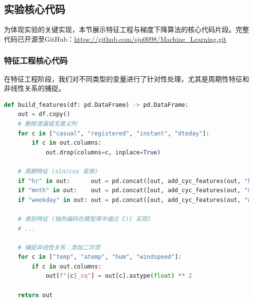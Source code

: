 \documentclass[UTF8,a4paper,10pt]{ctexart}
\begin{document}
\subsection{实验核心代码}
为体现实验的关键实现，本节展示特征工程与梯度下降算法的核心代码片段。完整代码已开源至GitHub：\url{https://github.com/sjq0098/Machine_Learning.git}

\subsubsection{特征工程核心代码}
在特征工程阶段，我们对不同类型的变量进行了针对性处理，尤其是周期性特征和非线性关系的捕捉。
\begin{lstlisting}[language=Python, caption={特征工程关键步骤}]
def build_features(df: pd.DataFrame) -> pd.DataFrame:
    out = df.copy()
    # 删除泄漏或无意义列
    for c in ["casual", "registered", "instant", "dteday"]:
        if c in out.columns:
            out.drop(columns=c, inplace=True)

    # 周期特征 (sin/cos 变换)
    if "hr" in out:      out = pd.concat([out, add_cyc_features(out, "hr", 24)], axis=1)
    if "mnth" in out:    out = pd.concat([out, add_cyc_features(out, "mnth", 12)], axis=1)
    if "weekday" in out: out = pd.concat([out, add_cyc_features(out, "weekday", 7)], axis=1)

    # 类别特征 (独热编码在模型库中通过 C() 实现)
    # ...

    # 捕捉非线性关系：添加二次项
    for c in ["temp", "atemp", "hum", "windspeed"]:
        if c in out.columns:
            out[f"{c}_sq"] = out[c].astype(float) ** 2

    return out
\end{lstlisting}
\end{document}
